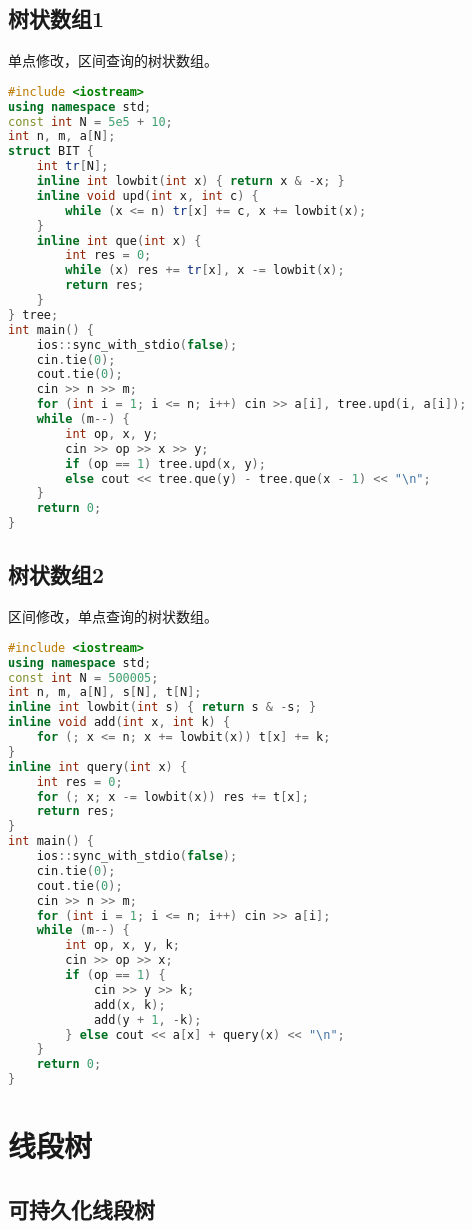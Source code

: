 \documentclass[9pt, a4paper, oneside]{book}
\begin{document}
\subsection{树状数组1}
单点修改，区间查询的树状数组。
\begin{lstlisting}[language={C++}]
#include <iostream>
using namespace std;
const int N = 5e5 + 10;
int n, m, a[N];
struct BIT {
    int tr[N];
    inline int lowbit(int x) { return x & -x; }
    inline void upd(int x, int c) {
        while (x <= n) tr[x] += c, x += lowbit(x);
    }
    inline int que(int x) {
        int res = 0;
        while (x) res += tr[x], x -= lowbit(x);
        return res;
    }
} tree;
int main() {
    ios::sync_with_stdio(false);
    cin.tie(0);
    cout.tie(0);
    cin >> n >> m;
    for (int i = 1; i <= n; i++) cin >> a[i], tree.upd(i, a[i]);
    while (m--) {
        int op, x, y;
        cin >> op >> x >> y;
        if (op == 1) tree.upd(x, y);
        else cout << tree.que(y) - tree.que(x - 1) << "\n";
    }
    return 0;
}\end{lstlisting}
\subsection{树状数组2}
区间修改，单点查询的树状数组。
\begin{lstlisting}[language={C++}]
#include <iostream>
using namespace std;
const int N = 500005;
int n, m, a[N], s[N], t[N];
inline int lowbit(int s) { return s & -s; }
inline void add(int x, int k) {
    for (; x <= n; x += lowbit(x)) t[x] += k;
}
inline int query(int x) {
    int res = 0;
    for (; x; x -= lowbit(x)) res += t[x];
    return res;
}
int main() {
    ios::sync_with_stdio(false);
    cin.tie(0);
    cout.tie(0);
    cin >> n >> m;
    for (int i = 1; i <= n; i++) cin >> a[i];
    while (m--) {
        int op, x, y, k;
        cin >> op >> x;
        if (op == 1) {
            cin >> y >> k;
            add(x, k);
            add(y + 1, -k);
        } else cout << a[x] + query(x) << "\n";
    }
    return 0;
}\end{lstlisting}
\section{线段树}
\subsection{可持久化线段树}
\end{document}
